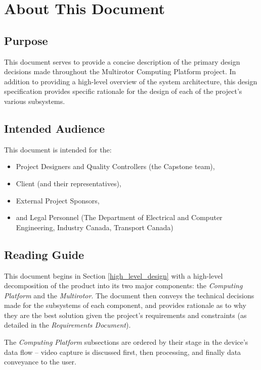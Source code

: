 \documentclass[10pt,letterpaper]{article}
\begin{document}


\section{About This Document}
\subsection{Purpose}
This document serves to provide a concise description of the primary design decisions made throughout the Multirotor Computing Platform project. In addition to providing a high-level overview of the system architecture, this design specification provides specific rationale for the design of each of the project's various subsystems.

\subsection{Intended Audience}
This document is intended for the:
\begin{itemize}
\item Project Designers and Quality Controllers (the Capstone team),
\item Client (and their representatives),
\item External Project Sponsors,
\item and Legal Personnel (The Department of Electrical and Computer Engineering, Industry Canada, Transport Canada)
\end{itemize}

\subsection{Reading Guide}

This document begins in Section \ref{high_level_design} with a high-level decomposition of the product into its two major components: the \textit{Computing Platform} and the \textit{Multirotor}. The document then conveys the technical decisions made for the subsystems of each component, and provides rationale as to why they are the best solution given the project's requirements and constraints (as detailed in the \textit{Requirements Document}). 

The \textit{Computing Platform} subsections are ordered by their stage in the device's data flow -- video capture is discussed first, then processing, and finally data conveyance to the user.
\end{document}
